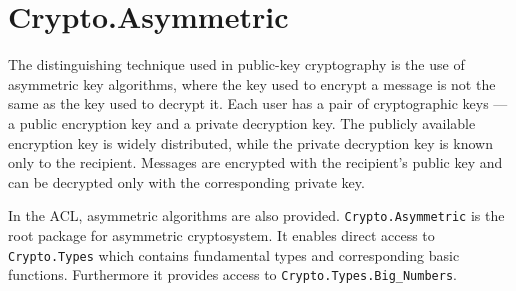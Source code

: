 \chapter{Crypto.Asymmetric}
The distinguishing technique used in public-key cryptography is the use of asymmetric key algorithms, where the key used to encrypt a message is not the same as the key used to decrypt it. Each user has a pair of cryptographic keys — a public encryption key and a private decryption key. The publicly available encryption key is widely distributed, while the private decryption key is known only to the recipient. Messages are encrypted with the recipient's public key and can be decrypted only with the corresponding private key. 

In the ACL, asymmetric algorithms are also provided. \texttt{Crypto.Asymmetric} is the root package for asymmetric cryptosystem. It enables direct access to \texttt{Crypto.Types} which contains fundamental types and corresponding basic functions. Furthermore it provides access to \texttt{Crypto.Types.Big\_Numbers}.
